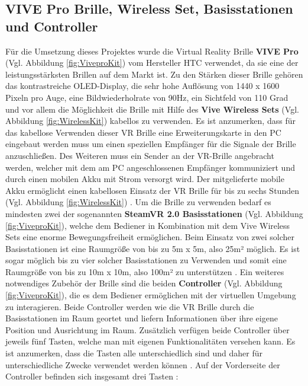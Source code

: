 \subsection{VIVE Pro Brille, Wireless Set, Basisstationen und Controller}\label{sec:GrundHardware}
Für die Umsetzung dieses Projektes wurde die Virtual Reality Brille \textbf{VIVE Pro} (Vgl. Abbildung \ref{fig:ViveproKit}) vom Hersteller HTC verwendet, da sie eine der leistungsstärksten Brillen auf dem Markt ist. Zu den Stärken dieser Brille gehören das kontrastreiche OLED-Display, die sehr hohe Auflösung von 1440 x 1600 Pixeln pro Auge, eine Bildwiederholrate von 90Hz, ein Sichtfeld von 110 Grad und vor allem die Möglichkeit die Brille mit Hilfe des \textbf{Vive Wireless Sets} (Vgl. Abbildung \ref{fig:WirelessKit}) kabellos zu verwenden. Es ist anzumerken, dass für das kabellose Verwenden dieser VR Brille eine Erweiterungskarte in den PC eingebaut werden muss um einen speziellen Empfänger für die Signale der Brille anzuschließen. Des Weiteren muss ein Sender an der VR-Brille angebracht werden, welcher mit dem am PC angeschlossenen Empfänger kommuniziert und durch einen mobilen Akku mit Strom versorgt wird. Der mitgelieferte mobile Akku ermöglicht einen kabellosen Einsatz der VR Brille für bis zu sechs Stunden (Vgl. Abbildung \ref{fig:WirelessKit}) \cite{28}.
\newline
Um die Brille zu verwenden bedarf es mindesten zwei der sogenannten \textbf{SteamVR 2.0 Basisstationen} (Vgl. Abbildung \ref{fig:ViveproKit}), welche dem Bediener in Kombination mit dem Vive Wireless Sets eine enorme Bewegungsfreiheit ermöglichen. Beim Einsatz von zwei solcher Basisstationen ist eine Raumgröße von bis zu 5m x 5m, also 25m² möglich. Es ist sogar möglich bis zu vier solcher Basisstationen zu Verwenden und somit eine Raumgröße von bis zu 10m x 10m, also 100m² zu unterstützen \cite{28}.
\newline
Ein weiteres notwendiges Zubehör der Brille sind die beiden \textbf{Controller} (Vgl. Abbildung \ref{fig:ViveproKit}), die es dem Bediener ermöglichen mit der virtuellen Umgebung zu interagieren. Beide Controller werden wie die VR Brille durch die Basisstationen im Raum geortet und liefern Informationen über ihre eigene Position und Ausrichtung im Raum. Zusätzlich verfügen beide Controller über jeweils fünf Tasten, welche man mit eigenen Funktionalitäten versehen kann. Es ist anzumerken, dass die Tasten alle unterschiedlich sind und daher für unterschiedliche Zwecke verwendet werden können \cite{29}.
\newline
Auf der Vorderseite der Controller befinden sich insgesamt drei Tasten \cite{29}:
